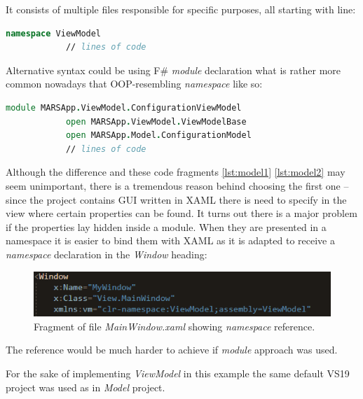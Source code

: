         It consists of multiple files responsible for specific purposes, all starting with line:
        
        \begin{lstlisting}[language=FSharp, label={lst:model1}, caption=F\# all \textit{ViewModel} project components beginning.]
            namespace ViewModel
            // lines of code
        \end{lstlisting}
        
        Alternative syntax could be using F\# \textit{module} declaration what is rather more common nowadays that OOP-resembling \textit{namespace} like so:
        
        \begin{lstlisting}[language=FSharp, label={lst:model2}, caption=F\# alternative example \textit{ViewModel} project component beginning.]
            module MARSApp.ViewModel.ConfigurationViewModel
            open MARSApp.ViewModel.ViewModelBase
            open MARSApp.Model.ConfigurationModel
            // lines of code
        \end{lstlisting}
        
        Although the difference and these code fragments \ref{lst:model1} \ref{lst:model2} may seem unimportant, there is a tremendous reason behind choosing the first one -- since the project contains GUI written in XAML there is need to specify in the view where certain properties can be found. It turns out there is a major problem if the properties lay hidden inside a module. When they are presented in a namespace it is easier to bind them with XAML as it is adapted to receive a \textit{namespace} declaration in the \textit{Window} heading:
        
        \begin{figure}[H]
            \centering
            \includegraphics{img/viewmodel_namespace.png}
            \caption{Fragment of file \textit{MainWindow.xaml} showing \textit{namespace} reference.}
            \label{fig:viewmodel_namespace}
        \end{figure}
        
        The reference would be much harder to achieve if \textit{module} approach was used.
        
        For the sake of implementing \textit{ViewModel} in this example the same default VS19 project was used as in \textit{Model} project.
        
